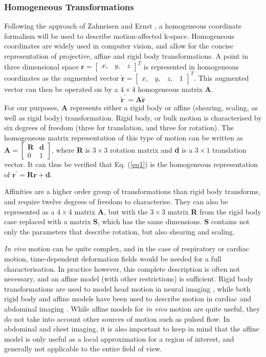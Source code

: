 \documentclass[class=article, crop=false]{standalone}
\begin{document}
\subsubsection*{Homogeneous Transformations}
Following the approach of Zahneisen and Ernst \parencite*{Zahneisen2016}, a homogeneous coordinate formalism will be used to describe motion-affected k-space. Homogeneous coordinates are widely used in computer vision, and allow for the concise representation of projective, affine and rigid body transformations. A point in three dimensional space $\textbf{r} = \begin{bmatrix} x,&y,&z\end{bmatrix}^{T}$ is represented in homogeneous coordinates as the augmented vector $\tilde{\textbf{r}} = \begin{bmatrix}x,&y,&z,&1\end{bmatrix}^{T}$. This augmented vector can then be operated on by a $4\times4$ homogeneous matrix \textbf{A}.
\begin{equation}
	\label{eq1}
	\tilde{\textbf{r}}^{'} = \textbf{A}\tilde{\textbf{r}}
\end{equation}
For our purposes, \textbf{A} represents either a rigid body or affine (shearing, scaling, as well as rigid body) transformation. Rigid body, or bulk motion is characterised by six degrees of freedom (three for translation, and three for rotation). The homogeneous matrix representation of this type of motion can be written as $\textbf{A} = \begin{bmatrix} \textbf{R} & \textbf{d} \\ 0 & 1 \end{bmatrix}$, where \textbf{R} is $3\times3$ rotation matrix and \textbf{d} is a $3\times1$ translation vector. It can thus be verified that Eq. (\ref{eq1}) is the homogeneous representation of $\textbf{r}^{'} = \textbf{R} \textbf{r} + \textbf{d}$.
\par
Affinities are a higher order group of transformations than rigid body transforms, and require twelve degrees of freedom to characterise. They can also be represented as a $4\times4$ matrix \textbf{A}, but with the $3\times3$ matrix \textbf{R} from the rigid body case replaced with a matrix \textbf{S}, which has the same dimensions. \textbf{S} contains not only the parameters that describe rotation, but also shearing and scaling.
\par
\textit{In vivo} motion can be quite complex, and in the case of respiratory or cardiac motion, time-dependent deformation fields would be needed for a full characterisation. In practice however, this complete description is often not necessary, and an affine model (with other restrictions) is sufficient. Rigid body transformations are used to model head motion in neural imaging \parencite{Godenschweger2016}, while both rigid body and affine models have been used to describe motion in cardiac and abdominal imaging \parencite{Nehrke2005,Manke2002,Pipe1999}. While affine models for \textit{in vivo} motion are quite useful, they do not take into account other sources of motion such as pulsed flow. In abdominal and chest imaging, it is also important to keep in mind that the affine model is only useful as a local approximation for a region of interest, and generally not applicable to the entire field of view.
\end{document}
